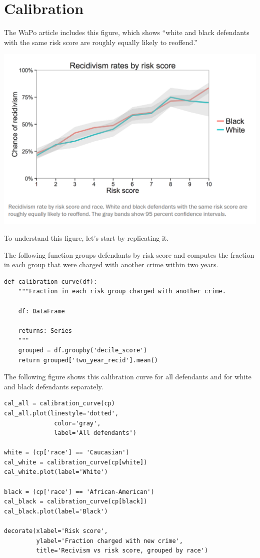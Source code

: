 \hypertarget{calibration-1}{%
\section{Calibration}\label{calibration-1}}

The WaPo article includes this figure, which shows ``white and black
defendants with the same risk score are roughly equally likely to
reoffend.''

\includegraphics{chapters/figs/calibration1.png}

To understand this figure, let's start by replicating it.

The following function groups defendants by risk score and computes the
fraction in each group that were charged with another crime within two
years.

\begin{lstlisting}[]
def calibration_curve(df):
    """Fraction in each risk group charged with another crime.
    
    df: DataFrame
    
    returns: Series
    """
    grouped = df.groupby('decile_score')
    return grouped['two_year_recid'].mean()
\end{lstlisting}

The following figure shows this calibration curve for all defendants and
for white and black defendants separately.

\begin{lstlisting}[]
cal_all = calibration_curve(cp)
cal_all.plot(linestyle='dotted', 
              color='gray',
              label='All defendants')

white = (cp['race'] == 'Caucasian')
cal_white = calibration_curve(cp[white])
cal_white.plot(label='White')

black = (cp['race'] == 'African-American')
cal_black = calibration_curve(cp[black])
cal_black.plot(label='Black')

decorate(xlabel='Risk score',
         ylabel='Fraction charged with new crime',
         title='Recivism vs risk score, grouped by race')
\end{lstlisting}


